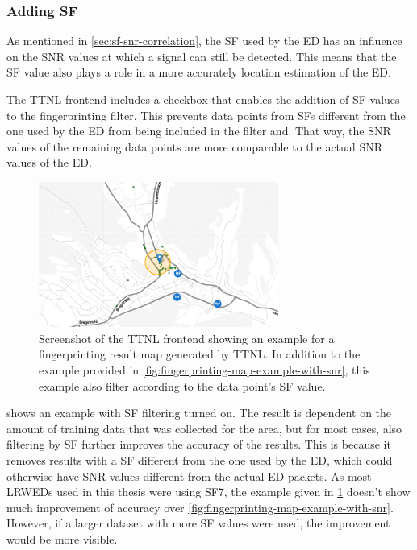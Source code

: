 \subsubsection{Adding \acl{SF}}

As mentioned in \cref{sec:sf-snr-correlation}, the \ac{SF} used by the \acl{ED} has an influence on the \ac{SNR} values at which a signal can still be detected.
This means that the \ac{SF} value also plays a role in a more accurately location estimation of the \acl{ED}.

The \ac{TTNL} frontend includes a checkbox that enables the addition of \ac{SF} values to the fingerprinting filter.
This prevents data points from \acp{SF} different from the one used by the \acl{ED} from being included in the filter and.
That way, the \ac{SNR} values of the remaining data points are more comparable to the actual \ac{SNR} values of the \acl{ED}.

\begin{figure}[htbp]
    \centering
    \includegraphics[width=0.7\textwidth]{pictures/ttn-locator/frontend/fingerprinting/fingerprinting_map_example_with_snr_sf.png}
    \caption{
        Screenshot of the \ac{TTNL} frontend showing an example for a fingerprinting result map generated by \ac{TTNL}.
        In addition to the example provided in \cref{fig:fingerprinting-map-example-with-snr}, this example also filter according to the data point's \ac{SF} value.
    }\label{fig:fingerprinting-map-example-with-snr-and-sf}
\end{figure}

 shows an example with \ac{SF} filtering turned on.
The result is dependent on the amount of training data that was collected for the area, but for most cases, also filtering by \ac{SF} further improves the accuracy of the results.
This is because it removes results with a \ac{SF} different from the one used by the \acl{ED}, which could otherwise have \ac{SNR} values different from the actual \acl{ED} packets.
As most \aclp{LRWED} used in this thesis were using \ac{SF}7, the example given in \cref{fig:fingerprinting-map-example-with-snr-and-sf} doesn't show much improvement of accuracy over \cref{fig:fingerprinting-map-example-with-snr}.
However, if a larger dataset with more \ac{SF} values were used, the improvement would be more visible.

